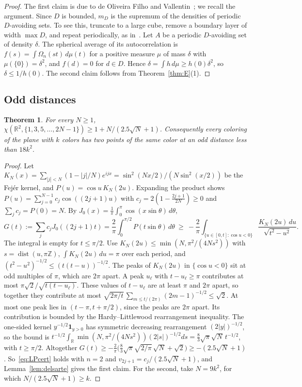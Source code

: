 \documentclass[11pt]{amsart}
\newtheorem{theorem}{Theorem}[section]
\theoremstyle{definition}
\newcommand{\R}{\mathbb{R}}
\begin{document}
\begin{proof}
The first claim is due to de Oliveira Filho and Vallentin~\cite{OV}; we recall the argument. Since $D$ is bounded, $m_D$ is the supremum of the densities of periodic $D$-avoiding sets. To see this, truncate to a large cube, remove a boundary layer of width $\max D$, and repeat periodically, as in~\cite[Lemma 2.2]{Crocker}. Let $A$ be a periodic $D$-avoiding set of density $\delta$. The spherical average of its autocorrelation is $f(s)=\int\Omega_n(st)\,d\mu(t)$ for a positive measure $\mu$ of mass $\delta$ with $\mu(\{0\})=\delta^2$, and $f(d)=0$ for $d\in D$. Hence $\delta=\int h\,d\mu\ge h(0)\delta^2$, so $\delta\le1/h(0)$. The second claim follows from Theorem~\ref{thm:E}(1).
\end{proof}

\subsection{Odd distances}

\begin{theorem}\label{thm:odd}
For every $N\ge1$, $\chi(\R^2,\{1,3,5,\dots,2N-1\})\ge 1+N/(2.5\sqrt N+1)$. Consequently every coloring of the plane with $k$ colors has two points of the same color at an odd distance less than $18k^2$.
\end{theorem}

\begin{proof}
Let $K_N(x)=\sum_{|j|<N}(1-|j|/N)e^{ijx}=\sin^2(Nx/2)/(N\sin^2(x/2))$ be the Fej\'er kernel, and $P(u)=\cos u\,K_N(2u)$. Expanding the product shows $P(u)=\sum_{j=0}^{N-1}c_j\cos((2j+1)u)$ with $c_j=2(1-\frac{2j+1}{2N})\ge0$ and $\sum_jc_j=P(0)=N$. By $J_0(x)=\frac1\pi\int_0^\pi\cos(x\sin\theta)\,d\theta$,
\[
G(t):=\sum_jc_jJ_0((2j+1)t)=\frac2\pi\int_0^{\pi/2}P(t\sin\theta)\,d\theta\ \ge\ -\frac2\pi\int_{\{u\in[0,t]:\cos u<0\}}\frac{K_N(2u)\,du}{\sqrt{t^2-u^2}} .
\]
The integral is empty for $t\le\pi/2$. Use $K_N(2u)\le\min(N,\pi^2/(4Ns^2))$ with $s=\operatorname{dist}(u,\pi\mathbb Z)$, $\int K_N(2u)\,du=\pi$ over each period, and $(t^2-u^2)^{-1/2}\le(t(t-u))^{-1/2}$. The peaks of $K_N(2u)$ in $\{\cos u<0\}$ sit at odd multiples of $\pi$, which are $2\pi$ apart. A peak $u_\ell$ with $t-u_\ell\ge\pi$ contributes at most $\pi\sqrt2/\sqrt{t(t-u_\ell)}$. These values of $t-u_\ell$ are at least $\pi$ and $2\pi$ apart, so together they contribute at most $\sqrt{2\pi/t}\,\sum_{m\le t/(2\pi)}(2m-1)^{-1/2}\le\sqrt2$. At most one peak lies in $(t-\pi,t+\pi/2)$, since the peaks are $2\pi$ apart. Its contribution is bounded by the Hardy--Littlewood rearrangement inequality. The one-sided kernel $y^{-1/2}\mathbf 1_{y>0}$ has symmetric decreasing rearrangement $(2|y|)^{-1/2}$, so the bound is $t^{-1/2}\int_{\R}\min(N,\pi^2/(4Ns^2))(2|s|)^{-1/2}ds=\tfrac83\sqrt{\pi}\sqrt N\,t^{-1/2}$, with $t\ge\pi/2$. Altogether $G(t)\ge-\frac2\pi\bigl(\tfrac{8}{3}\sqrt{\pi}\sqrt{2/\pi}\,\sqrt N+\sqrt2\bigr)\ge-(2.5\sqrt N+1)$. So~\eqref{eq:LPcert} holds with $n=2$ and $v_{2j+1}=c_j/(2.5\sqrt N+1)$, and Lemma~\ref{lem:delsarte} gives the first claim. For the second, take $N=9k^2$, for which $N/(2.5\sqrt N+1)\ge k$.
\end{proof}
\end{document}

